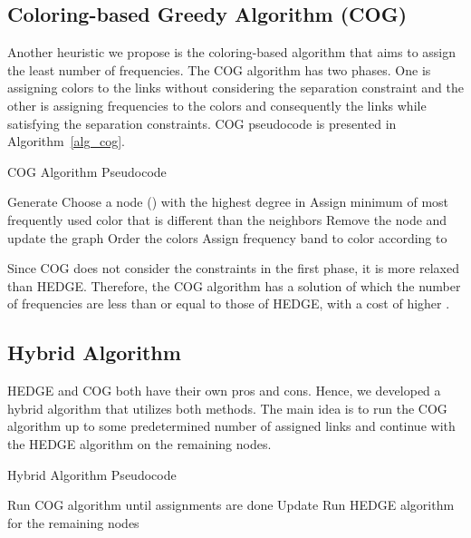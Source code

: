 \documentclass[10pt,twocolumn,twoside]{JCNtran}
\begin{document}
\subsection{Coloring-based Greedy Algorithm (COG)}
\label{subsec_cog}
Another heuristic we propose is the coloring-based algorithm that aims to assign the least number of frequencies. The COG algorithm has two phases. One is assigning colors to the links without considering the separation constraint and the other is assigning frequencies to the colors and consequently the links while satisfying the separation constraints. COG pseudocode is presented in Algorithm~\ref{alg_cog}.
\begin{algorithm}
\caption{COG Algorithm Pseudocode}
\begin{algorithmic}[1]
\REQUIRE 
\STATE Generate  
	\STATE Choose a node () with the highest degree in 
	\STATE Assign minimum of most frequently used color that is different than the neighbors
	\STATE Remove the node and update the graph 
\ENDWHILE
\STATE Order the colors
	\STATE Assign frequency band to color according to  
\ENDFOR
\end{algorithmic}
\label{alg_cog}
\end{algorithm}


Since COG does not consider the  constraints in the first phase, it is more relaxed than HEDGE. Therefore, the COG algorithm has a solution of which the number of frequencies are less than or equal to those of HEDGE, with a cost of higher . 


\subsection{Hybrid Algorithm}
\label{subsec_hybrid}
HEDGE and COG both have their own pros and cons. Hence, we developed a hybrid algorithm that utilizes both methods. The main idea is to run the COG algorithm up to some predetermined number of assigned links and continue with the HEDGE algorithm on the remaining nodes.
\begin{algorithm}
\caption{Hybrid Algorithm Pseudocode}
\begin{algorithmic}[1]
\REQUIRE 
\STATE Run COG algorithm until  assignments are done
\STATE Update 
\STATE Run HEDGE algorithm for the remaining nodes
\end{algorithmic}
\label{alg_hybrid}
\end{algorithm}
\end{document}
